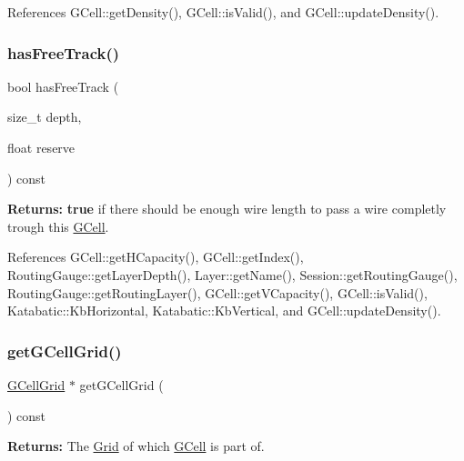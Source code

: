 References G\+Cell\+::get\+Density(), G\+Cell\+::is\+Valid(), and G\+Cell\+::update\+Density().

\mbox{\label{classKatabatic_1_1GCell_ac2275a015db51cc12dd53fb13d22ca4f}} 
\subsubsection{\texorpdfstring{has\+Free\+Track()}{hasFreeTrack()}}
{\footnotesize\ttfamily bool has\+Free\+Track (\begin{DoxyParamCaption}\item[{size\+\_\+t}]{depth,  }\item[{float}]{reserve }\end{DoxyParamCaption}) const}

{\bfseries Returns\+:} {\bfseries true} if there should be enough wire length to pass a wire completly trough this \mbox{\hyperlink{classKatabatic_1_1GCell}{G\+Cell}}. 

References G\+Cell\+::get\+H\+Capacity(), G\+Cell\+::get\+Index(), Routing\+Gauge\+::get\+Layer\+Depth(), Layer\+::get\+Name(), Session\+::get\+Routing\+Gauge(), Routing\+Gauge\+::get\+Routing\+Layer(), G\+Cell\+::get\+V\+Capacity(), G\+Cell\+::is\+Valid(), Katabatic\+::\+Kb\+Horizontal, Katabatic\+::\+Kb\+Vertical, and G\+Cell\+::update\+Density().

\mbox{\label{classKatabatic_1_1GCell_a9a56286f633fddd702d66563de457a4a}} 
\subsubsection{\texorpdfstring{get\+G\+Cell\+Grid()}{getGCellGrid()}}
{\footnotesize\ttfamily \mbox{\hyperlink{classKatabatic_1_1GCellGrid}{G\+Cell\+Grid}} $\ast$ get\+G\+Cell\+Grid (\begin{DoxyParamCaption}{ }\end{DoxyParamCaption}) const\hspace{0.3cm}{\ttfamily [inline]}}

{\bfseries Returns\+:} The \mbox{\hyperlink{classKatabatic_1_1Grid}{Grid}} of which \mbox{\hyperlink{classKatabatic_1_1GCell}{G\+Cell}} is part of. 

